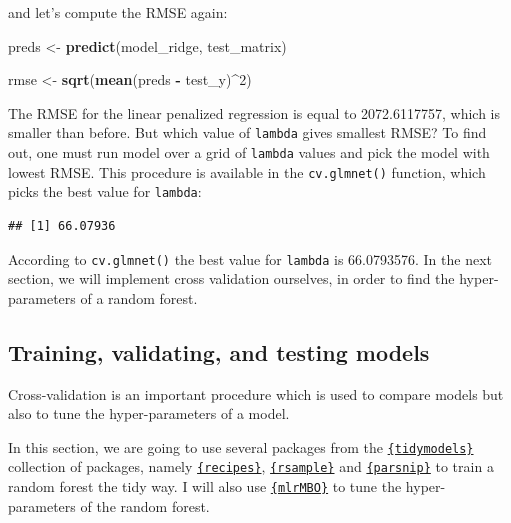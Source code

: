 \documentclass[]{gitbook}
\newenvironment{Shaded}{\begin{snugshade}}{\end{snugshade}}
\newcommand{\CommentTok}[1]{\textcolor[rgb]{0.56,0.35,0.01}{\textit{#1}}}
\newcommand{\DecValTok}[1]{\textcolor[rgb]{0.00,0.00,0.81}{#1}}
\newcommand{\KeywordTok}[1]{\textcolor[rgb]{0.13,0.29,0.53}{\textbf{#1}}}
\newcommand{\NormalTok}[1]{#1}
\newcommand{\OperatorTok}[1]{\textcolor[rgb]{0.81,0.36,0.00}{\textbf{#1}}}
\newcommand{\StringTok}[1]{\textcolor[rgb]{0.31,0.60,0.02}{#1}}
\theoremstyle{definition}
\theoremstyle{definition}
\theoremstyle{definition}
\theoremstyle{remark}
\begin{document}
and let's compute the RMSE again:

\begin{Shaded}
\begin{Highlighting}[]
\NormalTok{preds <-}\StringTok{ }\KeywordTok{predict}\NormalTok{(model_ridge, test_matrix)}

\NormalTok{rmse <-}\StringTok{ }\KeywordTok{sqrt}\NormalTok{(}\KeywordTok{mean}\NormalTok{(preds }\OperatorTok{-}\StringTok{ }\NormalTok{test_y)}\OperatorTok{^}\DecValTok{2}\NormalTok{)}
\end{Highlighting}
\end{Shaded}

The RMSE for the linear penalized regression is equal to 2072.6117757,
which is smaller than before. But which value of \texttt{lambda} gives
smallest RMSE? To find out, one must run model over a grid of
\texttt{lambda} values and pick the model with lowest RMSE. This
procedure is available in the \texttt{cv.glmnet()} function, which picks
the best value for \texttt{lambda}:

\begin{Shaded}
\end{Shaded}

\begin{verbatim}
## [1] 66.07936
\end{verbatim}

According to \texttt{cv.glmnet()} the best value for \texttt{lambda} is
66.0793576. In the next section, we will implement cross validation
ourselves, in order to find the hyper-parameters of a random forest.

\hypertarget{training-validating-and-testing-models}{%
\subsection{Training, validating, and testing
models}\label{training-validating-and-testing-models}}

Cross-validation is an important procedure which is used to compare
models but also to tune the hyper-parameters of a model.

In this section, we are going to use several packages from the
\href{https://github.com/tidymodels}{\texttt{\{tidymodels\}}} collection
of packages, namely
\href{https://tidymodels.github.io/recipes/}{\texttt{\{recipes\}}},
\href{https://tidymodels.github.io/rsample/}{\texttt{\{rsample\}}} and
\href{https://tidymodels.github.io/parsnip/}{\texttt{\{parsnip\}}} to
train a random forest the tidy way. I will also use
\href{http://mlrmbo.mlr-org.com/}{\texttt{\{mlrMBO\}}} to tune the
hyper-parameters of the random forest.
\end{document}
